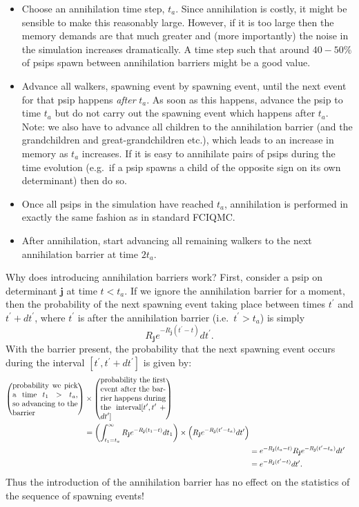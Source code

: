 \documentclass[a4paper, 11pt]{article}
\newcommand{\bj}{\mathbf{j}}
\begin{document}
\begin{itemize}
\item Choose an annihilation time step, $t_a$.  Since annihilation is costly, it might be sensible to make this reasonably large.  However, if it is too large then the memory demands are that much greater and (more importantly) the noise in the simulation increases dramatically.  A time step such that around $40-50\%$ of psips spawn between annihilation barriers might be a good value.
\item Advance all walkers, spawning event by spawning event, until the next event for that psip happens \emph{after} $t_a$.  As soon as this happens, advance the psip to time $t_a$ but do not carry out the spawning event which happens after $t_a$.  Note: we also have to advance all children to the annihilation barrier (and the grandchildren and great-grandchildren etc.), which leads to an increase in memory as $t_a$ increases.  If it is easy to annihilate pairs of psips during the time evolution (e.g.\ if a psip spawns a child of the opposite sign on its own determinant) then do so.
\item Once all psips in the simulation have reached $t_a$, annihilation is performed in exactly the same fashion as in standard FCIQMC.
\item After annihilation, start advancing all remaining walkers to the next annihilation barrier at time $2t_a$.
\end{itemize}

Why does introducing annihilation barriers work?  First, consider a psip on determinant $\bj$ at time $t<t_a$.  If we ignore the annihilation barrier for a moment, then the probability of the next spawning event taking place between times $t^\prime$ and $t^\prime+dt^\prime$, where $t^\prime$ is after the annihilation barrier (i.e.\ $t^\prime>t_a$) is simply
\begin{equation}
R_\bj e^{-R_\bj (t^\prime - t)} dt^\prime.
\end{equation}
With the barrier present, the probability that the next spawning event occurs during the interval $[t^\prime,t^\prime+dt^\prime]$ is given by:
\begin{align}
\begin{split}
\left(\textrm{\parbox{3cm}{probability we pick a time $t_1>t_a$, so advancing to the barrier}}\right) &\times \left(\textrm{\parbox{3cm}{probability the first event after the barrier happens during the interval$[t^\prime,t^\prime+dt^\prime]$}}\right) \\
&=  \left(\int_{t_1=t_a}^\infty R_\bj e^{-R_\bj(t_1-t)} dt_1\right) \times \left(R_\bj e^{-R_\bj(t^\prime-t_a)}dt^\prime\right)
\end{split} \\
&= e^{-R_\bj(t_a-t)} R_\bj e^{-R_\bj(t^\prime-t_a)} dt^\prime \\
&= e^{-R_\bj(t^\prime-t)} dt^\prime.
\end{align}
Thus the introduction of the annihilation barrier has no effect on the statistics of the sequence of spawning events!
\end{document}
